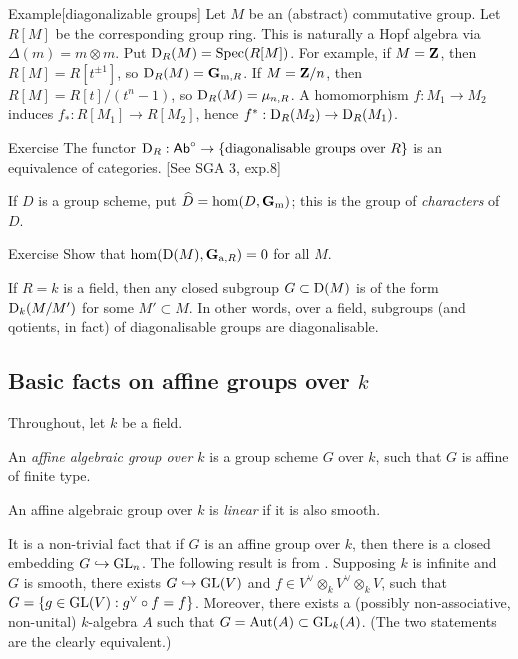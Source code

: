 \begin{enonce}[remark]{Example}[diagonalizable groups]
Let $M$ be an (abstract) commutative group. Let $R[M]$ be the corresponding 
group ring. This is naturally a Hopf algebra via 
$\Delta(m)=m\otimes m$. Put
$\operatorname{D}_R(M)=\operatorname{Spec}(R[M])$. For example, if $M=\mathbf{Z}$, then 
$R[M]=R[t^{\pm 1}]$, so $\operatorname{D}_R(M)=\mathbf{G}_{\mathrm{m}, R}$. If 
$M=\mathbf{Z}/n$, then $R[M]=R[t]/(t^n-1)$, so 
$\operatorname{D}_R(M)=\mu_{n,R}$. A homomorphism 
$f:M_1 \to M_2$ induces $f_\ast:R[M_1] \to R[M_2]$, hence 
$f^\ast:\operatorname{D}_R(M_2) \to \operatorname{D}_R(M_1)$. 
\end{enonce}

\begin{enonce}[remark]{Exercise}
The functor 
$\operatorname{D}_R:\mathsf{Ab}^\circ \to \{\text{diagonalisable groups over }R\}$ is 
an equivalence of categories. [See SGA 3, exp.8]
\end{enonce}

If $D$ is a group scheme, put $\widehat D=\hom(D,\mathbf{G}_{\mathrm{m}})$; this is the group 
of \emph{characters} of $D$. 

\begin{enonce}[remark]{Exercise}
Show that $\hom(\operatorname{D}(M), \mathbf{G}_{\mathrm{a},R}) = 0$ for all $M$. 
\end{enonce}

If $R=k$ is a field, then any closed subgroup $G\subset \operatorname{D}(M)$ is of 
the form $\operatorname{D}_k(M/M')$ for some $M'\subset M$. In other words, over a 
field, subgroups (and qotients, in fact) of diagonalisable groups are 
diagonalisable. 





\subsection{Basic facts on affine groups over \texorpdfstring{$k$}{k}}

Throughout, let $k$ be a field. 

\begin{defi}
An \emph{affine algebraic group over $k$} is a group scheme $G$ over $k$, such 
that $G$ is affine of finite type. 
\end{defi}

\begin{defi}
An affine algebraic group over $k$ is \emph{linear} if it is also smooth. 
\end{defi}

It is a non-trivial fact that if $G$ is an affine group over $k$, then there is 
a closed embedding $G\hookrightarrow \operatorname{GL}_n$. The following result is 
from \cite{gp03}. Supposing $k$ is infinite and $G$ is smooth, there 
exists $G\hookrightarrow \operatorname{GL}(V)$ and 
$f\in V^\vee\otimes_k V^\vee\otimes_k V$, such that 
$G=\{g\in \operatorname{GL}(V):g^\vee\circ f = f\}$. Moreover, there exists a 
(possibly non-associative, non-unital) $k$-algebra $A$ such that 
$G=\operatorname{Aut}(A)\subset \operatorname{GL}_k(A)$. (The two statements are the 
clearly equivalent.) 

